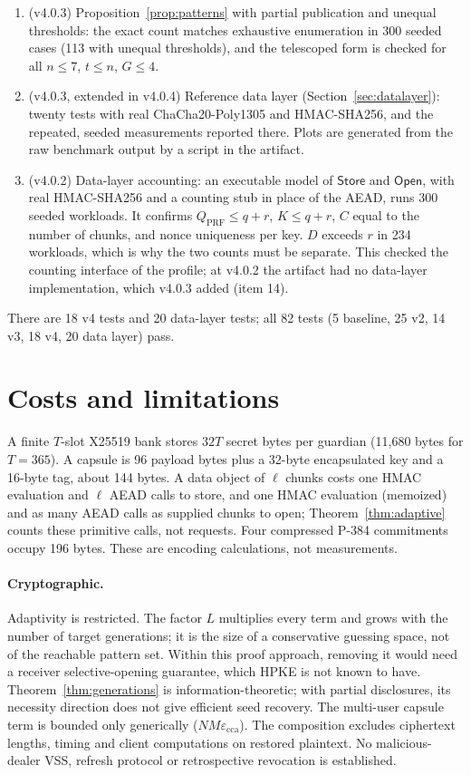 \documentclass[pdflatex,sn-mathphys-num]{sn-jnl}
\theoremstyle{plain}
\theoremstyle{definition}
\begin{document}
\begin{enumerate}
\item (v4.0.3) Proposition~\ref{prop:patterns} with partial publication and unequal thresholds: the exact count matches exhaustive enumeration in 300 seeded cases (113 with unequal thresholds), and the telescoped form is checked for all $n\le7$, $t\le n$, $G\le4$.
\item (v4.0.3, extended in v4.0.4) Reference data layer (Section~\ref{sec:datalayer}): twenty tests with real ChaCha20-Poly1305 and HMAC-SHA256, and the repeated, seeded measurements reported there. Plots are generated from the raw benchmark output by a script in the artifact.
\item (v4.0.2) Data-layer accounting: an executable model of $\mathsf{Store}$ and $\mathsf{Open}$, with real HMAC-SHA256 and a counting stub in place of the AEAD, runs 300 seeded workloads. It confirms $Q_{\mathrm{PRF}}\le q+r$, $K\le q+r$, $C$ equal to the number of chunks, and nonce uniqueness per key. $D$ exceeds $r$ in 234 workloads, which is why the two counts must be separate. This checked the counting interface of the profile; at v4.0.2 the artifact had no data-layer implementation, which v4.0.3 added (item 14).
\end{enumerate}
There are 18 v4 tests and 20 data-layer tests; all 82 tests (5 baseline, 25 v2, 14 v3, 18 v4, 20 data layer) pass.


\section{Costs and limitations}\label{sec:limits}

A finite $T$-slot X25519 bank stores $32T$ secret bytes per guardian (11,680 bytes for $T=365$). A capsule is 96 payload bytes plus a 32-byte encapsulated key and a 16-byte tag, about 144 bytes. A data object of $\ell$ chunks costs one HMAC evaluation and $\ell$ AEAD calls to store, and one HMAC evaluation (memoized) and as many AEAD calls as supplied chunks to open; Theorem~\ref{thm:adaptive} counts these primitive calls, not requests. Four compressed P-384 commitments occupy 196 bytes. These are encoding calculations, not measurements.

\paragraph{Cryptographic.}
Adaptivity is restricted. The factor $L$ multiplies every term and grows with the number of target generations; it is the size of a conservative guessing space, not of the reachable pattern set. Within this proof approach, removing it would need a receiver selective-opening guarantee, which HPKE is not known to have. Theorem~\ref{thm:generations} is information-theoretic; with partial disclosures, its necessity direction does not give efficient seed recovery. The multi-user capsule term is bounded only generically ($NM\varepsilon_{\mathrm{cca}}$). The composition excludes ciphertext lengths, timing and client computations on restored plaintext. No malicious-dealer VSS, refresh protocol or retrospective revocation is established.
\end{document}
